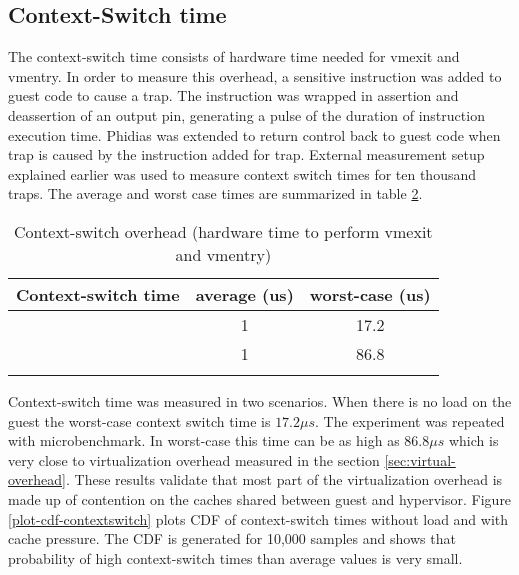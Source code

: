 \subsection{Context-Switch time} \label{sec:context-switch-overhead}
The context-switch time consists of hardware time needed for vmexit and vmentry.
In order to measure this overhead, a sensitive instruction was added to guest code to cause a trap. 
The instruction was wrapped in assertion and deassertion of an output pin, generating a pulse of the duration of instruction execution time.
Phidias was extended to return control back to guest code when trap is caused by the instruction added for trap.
External measurement setup explained earlier was used to measure context switch times for ten thousand traps.
The average and worst case times are summarized in table \ref{context-switch-time}.

\begin{table}[H]
\centering
\begin{longtable}{|c||c|c|}  
\hline
	Context-switch time	&	average (us)	&	worst-case (us) \\ \hline \hline
	\mnoload{}				&	1				&		17.2 \\ \hline
	\mcachepressure{}		&	1				&		86.8 \\ \hline
\caption{Context-switch overhead (hardware time to perform vmexit and vmentry)} 
\label{context-switch-time}
\end{longtable}
\end{table}

Context-switch time was measured in two scenarios. When there is no load on the guest
the worst-case context switch time is $17.2\mu{}s$. The experiment was repeated with \mcachepressure{} microbenchmark.
In worst-case this time can be as high as $86.8\mu{}s$ which is very close to virtualization overhead measured in the section \ref{sec:virtual-overhead}.
These results validate that most part of the virtualization overhead is made up of contention on the caches shared between guest and hypervisor.
Figure \ref{plot-cdf-contextswitch} plots CDF of context-switch times without load and with cache pressure.
The CDF is generated for 10,000 samples and shows that probability of high context-switch times than average values is very small.



